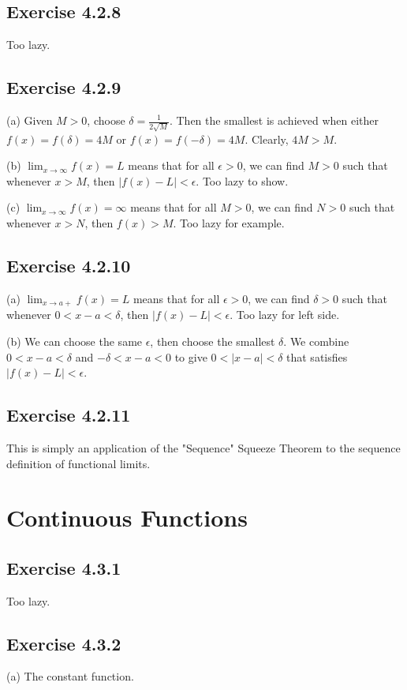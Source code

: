 \documentclass{book}
\begin{document}
\subsection*{Exercise 4.2.8}
Too lazy.

\subsection*{Exercise 4.2.9}
(a)
Given $M > 0$, choose $\delta = \frac{1}{2\sqrt{M}}$. Then the smallest is achieved when either $f(x) = f(\delta) = 4M$ or $f(x) = f(-\delta) = 4M$. Clearly, $4M > M$.

\noindent
(b)
$\lim_{x \rightarrow \infty} f(x) = L$ means that for all $\epsilon > 0$, we can find $M > 0$ such that whenever $x > M$, then $|f(x) - L| < \epsilon$. Too lazy to show.

\noindent
(c)
$\lim_{x \rightarrow \infty} f(x) = \infty$ means that for all $M > 0$, we can find $N > 0$ such that whenever $x > N$, then $f(x) > M$. Too lazy for example.

\subsection*{Exercise 4.2.10}
(a)
$\lim_{x \rightarrow a+} f(x) = L$ means that for all $\epsilon > 0$, we can find $\delta > 0$ such that whenever $0 < x - a < \delta$, then $|f(x) - L| < \epsilon$. Too lazy for left side.

\noindent
(b)
We can choose the same $\epsilon$, then choose the smallest $\delta$. We combine $0 < x - a < \delta$ and $-\delta < x - a < 0$ to give $0 < |x - a| < \delta$ that satisfies $|f(x) - L| < \epsilon$.

\subsection*{Exercise 4.2.11}
This is simply an application of the "Sequence" Squeeze Theorem to the sequence definition of functional limits.

\section{Continuous Functions}

\subsection*{Exercise 4.3.1}
Too lazy.

\subsection*{Exercise 4.3.2}
(a)
The constant function.
\end{document}

